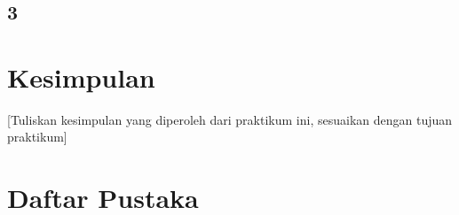 \documentclass[a4paper,oneside,11pt]{book}
\begin{document}
\chapter{}
\section{3}

\chapter{Kesimpulan}
[Tuliskan kesimpulan yang diperoleh dari praktikum ini, sesuaikan dengan tujuan praktikum]

\chapter{Daftar Pustaka}
\begin{enumerate}
    
\end{enumerate}
\end{document}
